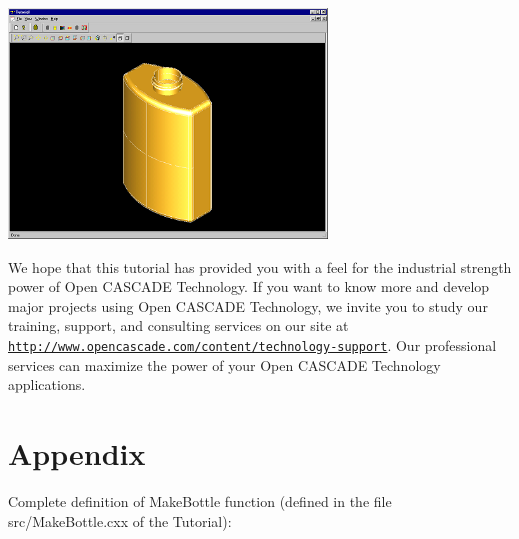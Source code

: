 \begin{DoxyImageNoCaption}
\begin{center}
   \mbox{\includegraphics[width=320]{tutorial_image019.png}}
\end{center}
\end{DoxyImageNoCaption}


We hope that this tutorial has provided you with a feel for the industrial strength power of Open C\+A\+S\+C\+A\+DE Technology. If you want to know more and develop major projects using Open C\+A\+S\+C\+A\+DE Technology, we invite you to study our training, support, and consulting services on our site at \href{http://www.opencascade.com/content/technology-support}{\tt http\+://www.\+opencascade.\+com/content/technology-\/support}. Our professional services can maximize the power of your Open C\+A\+S\+C\+A\+DE Technology applications.\hypertarget{occt__tutorial_sec6}{}\section{Appendix}\label{occt__tutorial_sec6}
Complete definition of Make\+Bottle function (defined in the file src/\+Make\+Bottle.\+cxx of the Tutorial)\+:



